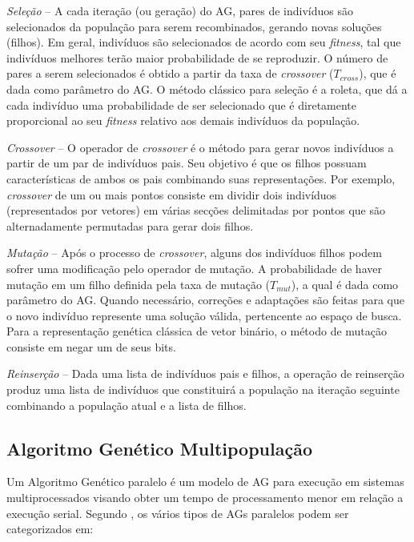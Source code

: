 \documentclass[fleqn,10pt]{SelfArx} %
\begin{document}

\textit{Seleção} -- A cada iteração (ou geração) do AG, pares de indivíduos são selecionados da população para serem recombinados, gerando novas soluções (filhos). Em geral, indivíduos são selecionados de acordo com seu \textit{fitness}, tal que indivíduos melhores terão maior probabilidade de se reproduzir. O número de pares a serem selecionados é obtido a partir da taxa de \textit{crossover} (\(T_{cross}\)), que é dada como parâmetro do AG. O método clássico para seleção é a roleta, que dá a cada indivíduo uma probabilidade de ser selecionado que é diretamente proporcional ao seu \textit{fitness} relativo aos demais indivíduos da população. \cite{Goldberg:1989:GAS:534133}


\textit{Crossover} -- O operador de \textit{crossover} é o método para gerar novos indivíduos a partir de um par de indivíduos pais. Seu objetivo é que os filhos possuam características de ambos os pais combinando suas representações. Por exemplo, \textit{crossover} de um ou mais pontos consiste em dividir dois indivíduos (representados por vetores) em várias secções delimitadas por pontos que são alternadamente permutadas para gerar dois filhos. \cite{Goldberg:1989:GAS:534133}


\textit{Mutação} -- Após o processo de \textit{crossover}, alguns dos indivíduos filhos podem sofrer uma modificação pelo operador de mutação. A probabilidade de haver mutação em um filho definida pela taxa de mutação (\(T_{mut}\)), a qual é dada como parâmetro do AG. Quando necessário, correções e adaptações são feitas para que o novo indivíduo represente uma solução válida, pertencente ao espaço de busca. Para a representação genética clássica de vetor binário, o método de mutação consiste em negar um de seus bits. \cite{Goldberg:1989:GAS:534133}


\textit{Reinserção} -- Dada uma lista de indivíduos pais e filhos, a operação de reinserção produz uma lista de indivíduos que constituirá a população na iteração seguinte combinando a população atual e a lista de filhos. \cite{Goldberg:1989:GAS:534133}


\subsection{Algoritmo Genético Multipopulação}

Um Algoritmo Genético paralelo é um modelo de AG para execução em sistemas multiprocessados visando obter um tempo de processamento menor em relação a execução serial. Segundo \citeauthor{cantu1998survey}, os vários tipos de AGs paralelos podem ser categorizados em:
\end{document}
